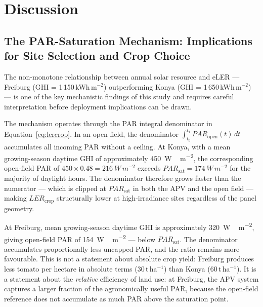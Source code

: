 
\section{Discussion}
\label{sec:discussion}


\subsection{The PAR-Saturation Mechanism: Implications for Site
	Selection and Crop Choice}
\label{sec:discussion_par}

\hspace{1cm}The non-monotone relationship between annual solar resource
and eLER --- Freiburg (GHI = 1\,150\,kWh\,m$^{-2}$) outperforming
Konya (GHI = 1\,650\,kWh\,m$^{-2}$) --- is one of the key mechanistic
findings of this study and requires careful interpretation before
deployment implications can be drawn.

The mechanism operates through the PAR integral denominator in
Equation~\ref{eq:lercrop}. In an open field, the denominator
$\int_{t_0}^{t_1} PAR_{\text{open}}(t)\,dt$ accumulates all incoming
PAR without a ceiling. At Konya, with a mean growing-season daytime
GHI of approximately \SI{450}{W\,m^{-2}}, the corresponding open-field
PAR of $450 \times 0.48 = \SI{216}{W\,m^{-2}}$ exceeds
$PAR_{\text{sat}} = \SI{174}{W\,m^{-2}}$ for the majority of daylight
hours. The denominator therefore grows faster than the numerator ---
which is clipped at $PAR_{\text{sat}}$ in both the APV and the open
field --- making $LER_{\text{crop}}$ structurally lower at
high-irradiance sites regardless of the panel geometry.

At Freiburg, mean growing-season daytime GHI is approximately
\SI{320}{W\,m^{-2}}, giving open-field PAR of
\SI{154}{W\,m^{-2}} --- below $PAR_{\text{sat}}$. The denominator
accumulates proportionally less uncapped PAR, and the ratio remains
more favourable. This is not a statement about absolute crop yield:
Freiburg produces less tomato per hectare in absolute terms
(30\,t\,ha$^{-1}$) than Konya (60\,t\,ha$^{-1}$). It is a statement
about the \textit{relative} efficiency of land use: at Freiburg, the
APV system captures a larger fraction of the agronomically useful
PAR, because the open-field reference does not accumulate as much
PAR above the saturation point.

